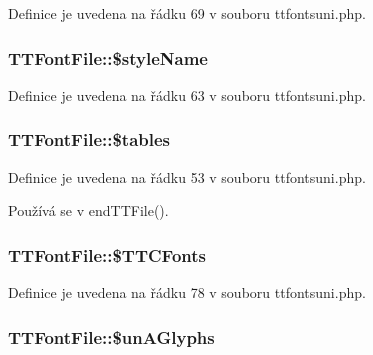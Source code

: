 Definice je uvedena na řádku 69 v souboru ttfontsuni.\-php.

\hypertarget{class_t_t_font_file_a0b6dd13bc02d5dadac224bd023826085}{
\subsubsection[{\$style\-Name}]{\setlength{\rightskip}{0pt plus 5cm}T\-T\-Font\-File\-::\$style\-Name}}\label{class_t_t_font_file_a0b6dd13bc02d5dadac224bd023826085}


Definice je uvedena na řádku 63 v souboru ttfontsuni.\-php.

\hypertarget{class_t_t_font_file_aeabef0522b9f6369b9bfb5148a19a8f1}{
\subsubsection[{\$tables}]{\setlength{\rightskip}{0pt plus 5cm}T\-T\-Font\-File\-::\$tables}}\label{class_t_t_font_file_aeabef0522b9f6369b9bfb5148a19a8f1}


Definice je uvedena na řádku 53 v souboru ttfontsuni.\-php.



Používá se v end\-T\-T\-File().

\hypertarget{class_t_t_font_file_ae549803b45ff95b400456343c5454d3c}{
\subsubsection[{\$\-T\-T\-C\-Fonts}]{\setlength{\rightskip}{0pt plus 5cm}T\-T\-Font\-File\-::\$\-T\-T\-C\-Fonts}}\label{class_t_t_font_file_ae549803b45ff95b400456343c5454d3c}


Definice je uvedena na řádku 78 v souboru ttfontsuni.\-php.

\hypertarget{class_t_t_font_file_a94264c48c7bd8587af1f0b24df9df9fd}{
\subsubsection[{\$un\-A\-Glyphs}]{\setlength{\rightskip}{0pt plus 5cm}T\-T\-Font\-File\-::\$un\-A\-Glyphs}}\label{class_t_t_font_file_a94264c48c7bd8587af1f0b24df9df9fd}


